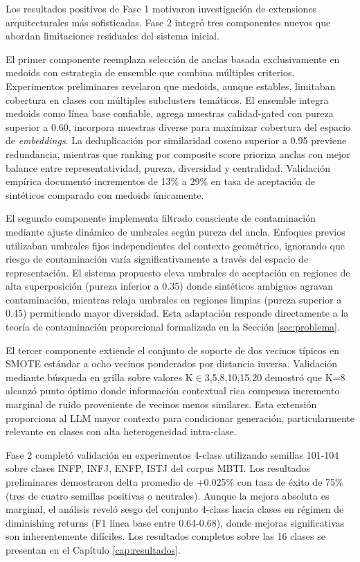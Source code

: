 Los resultados positivos de Fase 1 motivaron investigación de extensiones arquitecturales más sofisticadas. Fase 2 integró tres componentes nuevos que abordan limitaciones residuales del sistema inicial.

El primer componente reemplaza selección de anclas basada exclusivamente en medoids con estrategia de ensemble que combina múltiples criterios. Experimentos preliminares revelaron que medoids, aunque estables, limitaban cobertura en clases con múltiples subclusters temáticos. El ensemble integra medoids como línea base confiable, agrega muestras calidad-gated con pureza superior a 0.60, incorpora muestras diverse para maximizar cobertura del espacio de \textit{embeddings}. La deduplicación por similaridad coseno superior a 0.95 previene redundancia, mientras que ranking por composite score prioriza anclas con mejor balance entre representatividad, pureza, diversidad y centralidad. Validación empírica documentó incrementos de 13\% a 29\% en tasa de aceptación de sintéticos comparado con medoids únicamente.

El segundo componente implementa filtrado consciente de contaminación mediante ajuste dinámico de umbrales según pureza del ancla. Enfoques previos utilizaban umbrales fijos independientes del contexto geométrico, ignorando que riesgo de contaminación varía significativamente a través del espacio de representación. El sistema propuesto eleva umbrales de aceptación en regiones de alta superposición (pureza inferior a 0.35) donde sintéticos ambiguos agravan contaminación, mientras relaja umbrales en regiones limpias (pureza superior a 0.45) permitiendo mayor diversidad. Esta adaptación responde directamente a la teoría de contaminación proporcional formalizada en la Sección \ref{sec:problema}.

El tercer componente extiende el conjunto de soporte de dos vecinos típicos en SMOTE estándar a ocho vecinos ponderados por distancia inversa. Validación mediante búsqueda en grilla sobre valores K$\in${3,5,8,10,15,20} demostró que K=8 alcanzó punto óptimo donde información contextual rica compensa incremento marginal de ruido proveniente de vecinos menos similares. Esta extensión proporciona al LLM mayor contexto para condicionar generación, particularmente relevante en clases con alta heterogeneidad intra-clase.

Fase 2 completó validación en experimentos 4-class utilizando semillas 101-104 sobre clases INFP, INFJ, ENFP, ISTJ del corpus MBTI. Los resultados preliminares demostraron delta promedio de +0.025\% con tasa de éxito de 75\% (tres de cuatro semillas positivas o neutrales). Aunque la mejora absoluta es marginal, el análisis reveló sesgo del conjunto 4-class hacia clases en régimen de diminishing returns (F1 línea base entre 0.64-0.68), donde mejoras significativas son inherentemente difíciles. Los resultados completos sobre las 16 clases se presentan en el Capítulo \ref{cap:resultados}.

